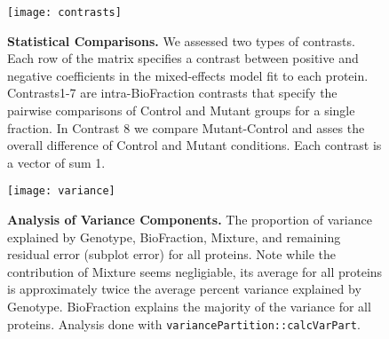 \newpage


\begin{figure}[h] %
  \begin{fullwidth}
  \begin{center}
	  \texttt{[image: contrasts]}
	  \caption{\textbf{Statistical Comparisons.} We assessed two types of
	  contrasts. Each row of the matrix specifies a contrast between
	  positive and negative coefficients in the mixed-effects model fit to
	  each protein. Contrasts1-7 are intra-BioFraction contrasts that
	  specify the pairwise comparisons of Control and Mutant groups for a
	  single fraction. In Contrast 8 we compare Mutant-Control and asses
	  the overall difference of Control and Mutant conditions.  Each
	  contrast is a vector of sum 1.}
	  \label{fig:contrasts}
  \end{center}
  \end{fullwidth}
\end{figure}

\newpage


\begin{figure}[h] %
  \begin{fullwidth}
  \begin{center}
	  \texttt{[image: variance]}
	  \caption{\textbf{Analysis of Variance Components.} 
	  The proportion of variance explained by Genotype, BioFraction,
	  Mixture, and remaining residual error (subplot error) for all
	  proteins. Note while the contribution of Mixture seems negligiable,
	  its average for all proteins is approximately twice the average
	  percent variance explained by Genotype. BioFraction explains the
	  majority of the variance for all proteins. Analysis done with
	  \texttt{variancePartition::calcVarPart}.}
	  \label{fig:variance}
  \end{center}
  \end{fullwidth}
\end{figure}

\newpage

